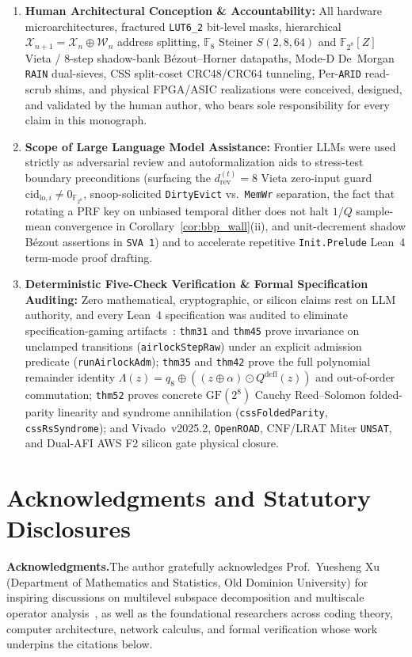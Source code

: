 \documentclass[11pt,letterpaper]{article}
\providecommand{\VivadoToolVersion}{v2025.2}
\theoremstyle{spectralthm}
\begin{document}
\begin{enumerate}
  \item \textbf{Human Architectural Conception \& Accountability:} All hardware microarchitectures, fractured \mbox{\texttt{LUT6\_2}} bit-level masks, hierarchical $\mathcal{X}_{n+1} = \mathcal{X}_n \oplus \mathcal{W}_n$ address splitting, $\mathbb{F}_8$ Steiner $S(2,8,64)$ and $\mathbb{F}_{2^8}[Z]$ Vieta / 8-step shadow-bank B\'{e}zout--Horner datapaths, Mode-D De~Morgan \texttt{RAIN} dual-sieves, CSS split-coset CRC48/CRC64 tunneling, Per-\texttt{ARID} read-scrub shims, and physical FPGA/ASIC realizations were conceived, designed, and validated by the human author, who bears sole responsibility for every claim in this monograph.
  \item \textbf{Scope of Large Language Model Assistance:} Frontier LLMs were used strictly as adversarial review and autoformalization aids to stress-test boundary preconditions (surfacing the $d_{\mathrm{rev}}^{(t)} = 8$ Vieta zero-input guard $\mathrm{cid}_{\mathrm{lo},i} \neq 0_{\mathbb{F}_{2^8}}$, snoop-solicited \texttt{DirtyEvict} vs.\ \texttt{MemWr} separation, the fact that rotating a PRF key on unbiased temporal dither does not halt $1/Q$ sample-mean convergence in Corollary~\ref{cor:bbp_wall}(ii), and unit-decrement shadow B\'{e}zout assertions in \texttt{SVA~1\textquotesingle}) and to accelerate repetitive \texttt{Init.Prelude} Lean~4 term-mode proof drafting.
  \item \textbf{Deterministic Five-Check Verification \& Formal Specification Auditing:} Zero mathematical, cryptographic, or silicon claims rest on LLM authority, and every Lean~4 specification was audited to eliminate specification-gaming artifacts~\cite{tao2026icm, leiden2026}: \texttt{thm31} and \texttt{thm45} prove invariance on unclamped transitions (\texttt{airlockStepRaw}) under an explicit admission predicate (\texttt{runAirlockAdm}); \texttt{thm35} and \texttt{thm42} prove the full polynomial remainder identity $\Lambda(z) = q_8 \oplus ((z\oplus\alpha)\odot Q^{\mathrm{defl}}(z))$ and out-of-order commutation; \texttt{thm52} proves concrete $\mathrm{GF}(2^8)$ Cauchy Reed--Solomon folded-parity linearity and syndrome annihilation (\texttt{cssFoldedParity}, \texttt{cssRsSyndrome}); and Vivado~\VivadoToolVersion, \texttt{OpenROAD}, CNF/LRAT Miter \texttt{UNSAT}, and Dual-AFI AWS F2 silicon gate physical closure.
\end{enumerate}

\section*{Acknowledgments and Statutory Disclosures}
\noindent\textbf{Acknowledgments.}\;The author gratefully acknowledges Prof.\ Yuesheng Xu (Department of Mathematics and Statistics, Old Dominion University) for inspiring discussions on multilevel subspace decomposition and multiscale operator analysis~\cite{chen2001multilevel}, as well as the foundational researchers across coding theory, computer architecture, network calculus, and formal verification whose work underpins the citations below.
\end{document}
